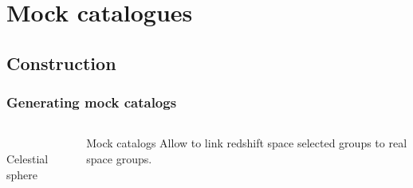 \section{Mock catalogues}

\subsection{Construction}
\begin{frame}
    \frametitle{Generating mock catalogs}

    \begin{columns}
        \begin{column}{0.5\textwidth}
            \centering
            \\
            \scriptsize Celestial sphere\hfill
        \end{column}
        \begin{column}{0.5\textwidth}
            \begin{block}{Mock catalogs}
                Allow to link redshift space selected groups to real space
                groups.
            \end{block}
        \end{column}
    \end{columns}
\end{frame}

